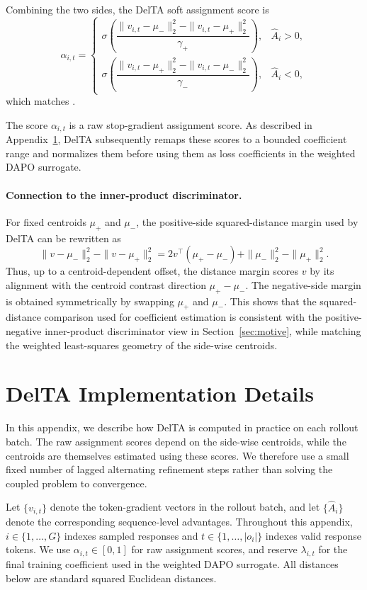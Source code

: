\documentclass{article} %
\begin{document}
Combining the two sides, the DelTA soft assignment score is
\[
\alpha_{i,t}
=
\begin{cases}
\sigma\!\left(
\dfrac{
\|v_{i,t}-\mu_-\|_2^2
-
\|v_{i,t}-\mu_+\|_2^2
}{
\gamma_+
}
\right),
& \hat A_i>0,\\[1.2ex]
\sigma\!\left(
\dfrac{
\|v_{i,t}-\mu_+\|_2^2
-
\|v_{i,t}-\mu_-\|_2^2
}{
\gamma_-
}
\right),
& \hat A_i<0,
\end{cases}
\]
which matches .

The score \(\alpha_{i,t}\) is a raw stop-gradient assignment score. As described
in Appendix~\ref{app:DelTA-iteration}, DelTA subsequently remaps these scores
to a bounded coefficient range and normalizes them before using them as loss
coefficients in the weighted DAPO surrogate.

\paragraph{Connection to the inner-product discriminator.}
For fixed centroids \(\mu_+\) and \(\mu_-\), the positive-side squared-distance margin used by DelTA can be rewritten as
\[
\|v-\mu_-\|_2^2-\|v-\mu_+\|_2^2
=
2v^\top(\mu_+-\mu_-)
+
\|\mu_-\|_2^2-\|\mu_+\|_2^2 .
\]
Thus, up to a centroid-dependent offset, the distance margin scores \(v\) by its alignment with the centroid contrast direction \(\mu_+-\mu_-\). 
The negative-side margin is obtained symmetrically by swapping \(\mu_+\) and \(\mu_-\). 
This shows that the squared-distance comparison used for coefficient estimation is consistent with the positive-negative inner-product discriminator view in Section~\ref{sec:motive}, while matching the weighted least-squares geometry of the side-wise centroids.

\section{DelTA Implementation Details}
\label{app:DelTA-iteration}

In this appendix, we describe how DelTA is computed in practice on each rollout batch.
The raw assignment scores depend on the side-wise centroids, while the centroids are themselves estimated using these scores.
We therefore use a small fixed number of lagged alternating refinement steps rather than solving the coupled problem to convergence.

Let \(\{v_{i,t}\}\) denote the token-gradient vectors in the rollout batch, and let \(\{\hat A_i\}\) denote the corresponding sequence-level advantages.
Throughout this appendix, \(i\in\{1,\dots,G\}\) indexes sampled responses and \(t\in\{1,\dots,|o_i|\}\) indexes valid response tokens.
We use \(\alpha_{i,t}\in[0,1]\) for raw assignment scores, and reserve \(\lambda_{i,t}\) for the final training coefficient used in the weighted DAPO surrogate.
All distances below are standard squared Euclidean distances.
\end{document}
